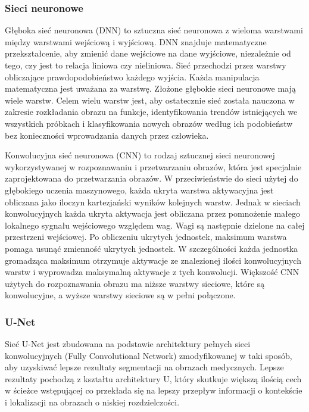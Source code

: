\documentclass[a4paper,11pt,twoside]{report}
\theoremstyle{definition}
\begin{document}
\subsubsection{Sieci neuronowe}

Głęboka sieć neuronowa (DNN) to sztuczna sieć neuronowa z wieloma warstwami między warstwami wejściową i wyjściową. DNN znajduje matematyczne przekształcenie, aby zmienić dane wejściowe na dane wyjściowe, niezależnie od tego, czy jest to relacja liniowa czy nieliniowa. Sieć przechodzi przez warstwy obliczające prawdopodobieństwo każdego wyjścia. Każda manipulacja matematyczna jest uważana za warstwę. Złożone głębokie sieci neuronowe mają wiele warstw. Celem wielu warstw jest, aby ostatecznie sieć została nauczona w zakresie rozkładania obrazu na funkcje, identyfikowania trendów istniejących we wszystkich próbkach i klasyfikowania nowych obrazów według ich podobieństw bez konieczności wprowadzania danych przez człowieka.
\par
Konwolucyjna  sieć neuronowa (CNN) to rodzaj sztucznej sieci neuronowej wykorzystywanej w rozpoznawaniu i przetwarzaniu obrazów, która jest specjalnie zaprojektowana do przetwarzania obrazów. W przeciwieństwie do sieci użytej do głębokiego uczenia maszynowego, każda ukryta warstwa aktywacyjna jest obliczana jako iloczyn kartezjański wyników kolejnych warstw. Jednak w sieciach konwolucyjnych każda ukryta aktywacja jest obliczana przez pomnożenie małego lokalnego sygnału wejściowego względem wag. Wagi są następnie dzielone na całej przestrzeni wejściowej. Po obliczeniu ukrytych jednostek, maksimum warstwa pomaga usunąć zmienność ukrytych jednostek. W szczególności każda jednostka gromadząca maksimum otrzymuje aktywacje ze znalezionej ilości konwolucyjnych warstw i wyprowadza maksymalną aktywacje z tych konwolucji. Większość CNN użytych do rozpoznawania obrazu ma niższe warstwy sieciowe, które są konwolucyjne, a wyższe warstwy sieciowe są w pełni połączone.

\subsubsection{U-Net}
Sieć U-Net\cite{siec_unet} jest zbudowana na podstawie architektury pełnych sieci konwolucyjnych (Fully Convolutional Network) zmodyfikowanej w taki sposób, aby uzyskiwać lepsze rezultaty segmentacji na obrazach medycznych. Lepsze rezultaty pochodzą z kształtu architektury U, który skutkuje większą ilością cech w ścieżce wstępującej co przekłada się na lepszy przepływ informacji o kontekście i lokalizacji na obrazach o niskiej rozdzielczości.
\end{document}
